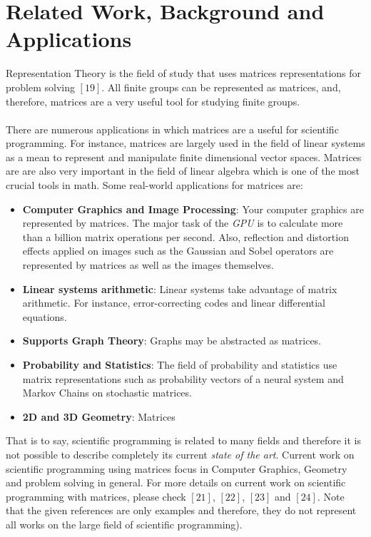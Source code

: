 \documentclass[conference]{IEEEtran}
\begin{document}
\section{Related Work, Background and Applications}
Representation Theory is the field of study that uses matrices representations for problem solving  $[19]$. All finite groups can be represented as matrices, and, therefore, matrices are a very useful tool for studying finite groups.
\\\\
There are numerous applications in which matrices are a useful for scientific programming. For instance, matrices are largely used in the field of linear systems as a mean to represent and manipulate finite dimensional vector spaces. Matrices are are also very important in the field of linear algebra which is one of the most crucial tools in math. Some real-world applications for matrices are:  

\begin{itemize}
	\item \textbf{Computer Graphics and Image Processing}: Your computer graphics are represented by matrices. The major task of the \textit{GPU} is to calculate more than a billion matrix operations per second. Also, reflection and distortion effects applied on images such as the Gaussian and Sobel operators are represented by matrices as well as the images themselves.
	\item \textbf{Linear systems arithmetic}: Linear systems take advantage of matrix arithmetic. For instance, error-correcting codes and linear differential equations.
	\item \textbf{Supports Graph Theory}: Graphs may be abstracted as matrices.
	\item \textbf{Probability and Statistics}: The field of probability and statistics use matrix representations such as probability vectors of a neural system and Markov Chains on stochastic matrices.
	\item \textbf{2D and 3D Geometry}: Matrices 
\end{itemize}

That is to say, scientific programming is related to many fields and therefore it is not possible to describe completely its current \textit{state of the art}. Current work on scientific programming using matrices focus in Computer Graphics, Geometry and problem solving in general. For more details on current work on scientific programming with matrices, please check $[21]$, $[22]$, $[23]$ and $[24]$. Note that the given references are only examples and therefore, they do not represent all works on the large field of scientific programming). 
\end{document}
